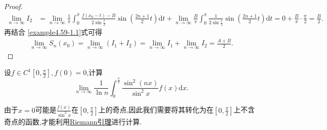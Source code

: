 \documentclass[../../main.tex]{subfiles}
\begin{document}
\begin{proof}
\begin{align*}
\lim_{n\rightarrow \infty} I_2&=\lim_{n\rightarrow \infty} \frac{1}{\pi}\int_0^{\pi}{\frac{f(x_0 - t) - B}{2\sin \frac{t}{2}}\sin \left( \frac{2n + 1}{2}t \right) \mathrm{d}t}+\lim_{n\rightarrow \infty} \frac{B}{\pi}\int_0^{\pi}{\frac{1}{2\sin \frac{t}{2}}\sin \left( \frac{2n + 1}{2}t \right) \mathrm{d}t}
=0 + \frac{B}{\pi}\cdot \frac{\pi}{2}
=\frac{B}{2}.
\end{align*}
再结合 \eqref{example4.59-1.1}式可得
\begin{align*}
\lim_{n\rightarrow \infty} S_n(x_0)=\lim_{n\rightarrow \infty} (I_1 + I_2)
=\lim_{n\rightarrow \infty} I_1 + \lim_{n\rightarrow \infty} I_2
=\frac{A + B}{2}.
\end{align*}
\end{proof}

\begin{example}
设\(f\in C^{1}[0,\frac{\pi}{2}],f(0)=0\),计算
\[
\lim_{n\rightarrow\infty}\frac{1}{\ln n}\int_{0}^{\frac{\pi}{2}}\frac{\sin^{2}(nx)}{\sin^{2}x}f(x)\mathrm{d}x.
\]
\end{example}
\begin{remark}
由于\(x = 0\)可能是\(\frac{f(x)}{\sin^2x}\)在\(\left[0, \frac{\pi}{2}\right]\)上的奇点,因此我们需要将其转化为在\(\left[0, \frac{\pi}{2}\right]\)上不含奇点的函数,才能利用\hyperref[theorem:Riemann引理]{Riemann引理}进行计算.
\end{remark}
\end{document}
